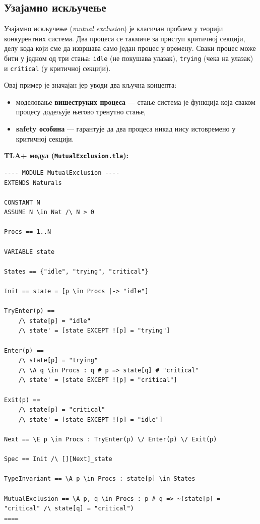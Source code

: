 \subsection{Узајамно искључење}
\begin{primer}
Узајамно искључење (\textit{mutual exclusion}) је класичан проблем у теорији конкурентних система.
Два процеса се такмиче за приступ критичној секцији, делу кода који сме да извршава само један процес у времену.
Сваки процес може бити у једном од три стања: \texttt{idle} (не покушава улазак), \texttt{trying} (чека на улазак) и \texttt{critical} (у критичној секцији).

Овај пример је значајан јер уводи два кључна концепта:
\begin{itemize}
    \item моделовање \textbf{вишеструких процеса} --- стање система је функција која сваком процесу додељује његово тренутно стање,
    \item \textbf{safety особина} --- гарантује да два процеса никад нису истовремено у критичној секцији.
\end{itemize}

\textbf{TLA+ модул (\texttt{MutualExclusion.tla}):}
\begin{lstlisting}
---- MODULE MutualExclusion ----
EXTENDS Naturals

CONSTANT N
ASSUME N \in Nat /\ N > 0

Procs == 1..N

VARIABLE state

States == {"idle", "trying", "critical"}

Init == state = [p \in Procs |-> "idle"]

TryEnter(p) ==
    /\ state[p] = "idle"
    /\ state' = [state EXCEPT ![p] = "trying"]

Enter(p) ==
    /\ state[p] = "trying"
    /\ \A q \in Procs : q # p => state[q] # "critical"
    /\ state' = [state EXCEPT ![p] = "critical"]

Exit(p) ==
    /\ state[p] = "critical"
    /\ state' = [state EXCEPT ![p] = "idle"]

Next == \E p \in Procs : TryEnter(p) \/ Enter(p) \/ Exit(p)

Spec == Init /\ [][Next]_state

TypeInvariant == \A p \in Procs : state[p] \in States

MutualExclusion == \A p, q \in Procs : p # q => ~(state[p] = "critical" /\ state[q] = "critical")
====
\end{lstlisting}


\end{primer}
